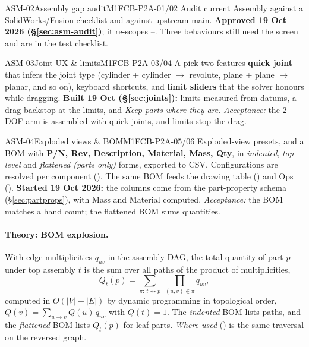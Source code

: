 \begin{epic}{ASM-02}{Assembly gap audit}{M1}{\stDone}{FCB-P2A-01/02}
Audit current Assembly against a SolidWorks/Fusion checklist and against upstream main. \textbf{Approved
19 Oct 2026 (\S\ref{sec:asm-audit})}; it re-scopes --. Three behaviours still need the
screen and are in the test checklist.
\end{epic}





\begin{epic}{ASM-03}{Joint UX \& limits}{M1}{\stProg}{FCB-P2A-03/04}
A pick-two-features \textbf{quick joint} that infers the joint type (cylinder + cylinder $\rightarrow$
revolute, plane + plane $\rightarrow$ planar, and so on), keyboard shortcuts, and \textbf{limit sliders} that the
solver honours while dragging. \textbf{Built 19 Oct (\S\ref{sec:joints}):} limits measured from datums, a drag
backstop at the limits, and \emph{Keep parts where they are}.
\emph{Acceptance:} the 2-DOF arm is assembled with quick joints, and limits stop the drag.
\end{epic}

\begin{epic}{ASM-04}{Exploded views \& BOM}{M1}{\stProg}{FCB-P2A-05/06}
Exploded-view presets, and a BOM with \textbf{P/N, Rev, Description, Material, Mass, Qty}, in
\emph{indented}, \emph{top-level} and \emph{flattened (parts only)} forms, exported to CSV. Configurations are
resolved per component (). The same BOM feeds the drawing table () and Ops
().
\textbf{Started 19 Oct 2026:} the columns come from the part-property schema (\S\ref{sec:partprops}), with
Mass and Material computed.
\emph{Acceptance:} the  BOM matches a hand count; the flattened BOM sums quantities.
\end{epic}

\paragraph{Theory: BOM explosion.} With edge multiplicities $q_{uv}$ in the assembly DAG, the total quantity
of part $p$ under top assembly $t$ is the sum over all paths of the product of multiplicities,
\[
  Q_t(p) = \sum_{\pi:\,t\rightsquigarrow p}\ \prod_{(u,v)\in\pi} q_{uv},
\]
computed in $O(|V|+|E|)$ by dynamic programming in topological order, $Q(v)=\sum_{u\to v}Q(u)\,q_{uv}$ with
$Q(t)=1$. The \emph{indented} BOM lists paths, and the \emph{flattened} BOM lists $Q_t(p)$ for leaf parts.
\emph{Where-used} () is the same traversal on the reversed graph.

